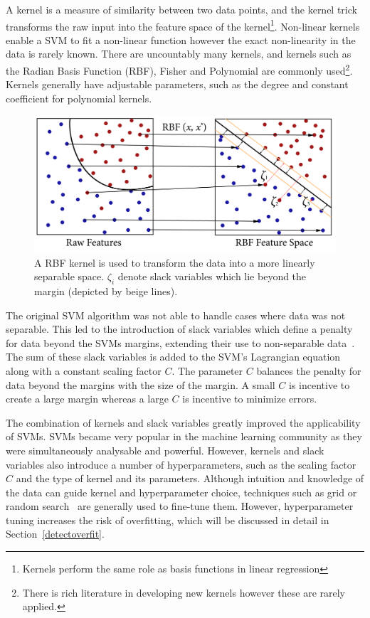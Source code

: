 \documentclass[12pt, twoside]{book}
\begin{document}
A kernel is a measure of similarity between two data points, and the kernel trick transforms the raw input into the feature space of the kernel\footnote{Kernels perform the same role as basis functions in linear regression}. Non-linear kernels enable a SVM to fit a non-linear function however the exact non-linearity in the data is rarely known. There are uncountably many kernels, and kernels such as the Radian Basis Function (RBF), Fisher and Polynomial are commonly used\footnote{There is rich literature in developing new kernels however these are rarely applied.}. Kernels generally have adjustable parameters, such as the degree and constant coefficient for polynomial kernels. 

\begin{figure}[h]
	\label{svm}
	\centering\includegraphics[width=0.8\linewidth]{svm.png}
	\caption{A RBF kernel is used to transform the data into a more linearly separable space. $\zeta_i$ denote slack variables which lie beyond the margin (depicted by beige lines). }
\end{figure}

The original SVM algorithm was not able to handle cases where data was not separable. This led to the introduction of slack variables which define a penalty for data beyond the SVMs margins, extending their use to non-separable data~\cite{svmsoftmargin}. The sum of these slack variables is added to the SVM's Lagrangian equation along with a constant scaling factor $C$. The parameter $C$ balances the penalty for data beyond the margins with the size of the margin. A small $C$ is incentive to create a large margin whereas a large $C$ is incentive to minimize errors.

The combination of kernels and slack variables greatly improved the applicability of SVMs. SVMs became very popular in the machine learning community as they were simultaneously analysable and powerful. However, kernels and slack variables also introduce a number of hyperparameters, such as the scaling factor $C$ and the type of kernel and its parameters. Although intuition and knowledge of the data can guide kernel and hyperparameter choice, techniques such as grid or random search~\cite{gridsearch} are generally used to fine-tune them. However, hyperparameter tuning increases the risk of overfitting, which will be discussed in detail in Section~\ref{detectoverfit}. 
\end{document}
